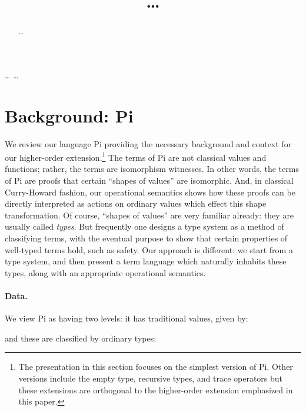 \documentclass{sigplanconf}
\begin{document}
\copyrightdata{[to be supplied]} 

\title{\ldots}
\authorinfo{\ldots}
           {\ldots}
           {\ldots}

\maketitle

\begin{abstract}
\ldots
\end{abstract}

\section{Background: {{Pi}} }
\label{sec:pi}

We review our language {{Pi}} providing the necessary background and
context for our higher-order extension.\footnote{The presentation in this
  section focuses on the simplest version of {{Pi}}. Other versions
  include the empty type, recursive types, and trace operators but these
  extensions are orthogonal to the higher-order extension emphasized in this
  paper.} The terms of {{Pi}} are not classical values and functions;
rather, the terms are isomorphism witnesses.  In other words, the terms of
{{Pi}} are proofs that certain ``shapes of values'' are isomorphic.
And, in classical Curry-Howard fashion, our operational semantics shows how
these proofs can be directly interpreted as actions on ordinary values which
effect this shape transformation. Of course, ``shapes of values'' are very
familiar already: they are usually called \emph{types}.  But frequently one
designs a type system as a method of classifying terms, with the eventual
purpose to show that certain properties of well-typed terms hold, such as
safety.  Our approach is different: we start from a type system, and then
present a term language which naturally inhabits these types, along with an
appropriate operational semantics.

\paragraph*{Data.}
We view {{Pi}} as having two levels:  it has traditional values, given by:

\noindent and these are classified by ordinary types:
\end{document}
